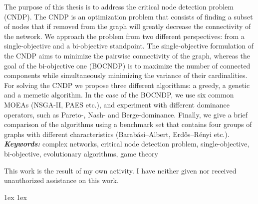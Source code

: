 \documentclass[final]{ubb_dolgozat}
\author{%
Béczi Eliézer
}
\providecommand{\keywords}[1]
{
  \small
  \textbf{\textit{Keywords:}} #1
}
\begin{document}
\maketitle

\begin{abstractEN} %
  {
    \vfill
    The purpose of this thesis is to address the critical node detection problem (CNDP).
    The CNDP is an optimization problem that consists of finding a subset of nodes that if removed from the graph will greatly decrease the connectivity of the network.
    We approach the problem from two different perspectives: from a single-objective and a bi-objective standpoint.
    The single-objective formulation of the CNDP aims to minimize the pairwise connectivity of the graph, whereas the goal of the bi-objective one (BOCNDP) is to maximize the number of connected components while simultaneously minimizing the variance of their cardinalities.
    For solving the CNDP we propose three different algorithms: a greedy, a genetic and a memetic algorithm.
    In the case of the BOCNDP, we use six common MOEAs (NSGA-II, PAES etc.), and experiment with different dominance operators, such as Pareto-, Nash- and Berge-dominance.
    Finally, we give a brief comparison of the algorithms using a benchmark set that contains four groups of graphs with different characteristics (Barabási–Albert, Erdős–Rényi etc.).
    \\[.5cm]
    \keywords{
      complex networks,
      critical node detection problem,
      single-objective,
      bi-objective,
      evolutionary algorithms,
      game theory
    }
    \vfill
  }
  \vspace*{.5cm}
  This work is the result of my own activity. I have neither given nor received unauthorized assistance on this work.
\end{abstractEN}

{
\baselineskip 1ex
\parskip 1ex
\tableofcontents
}












{ \renewcommand{\baselinestretch}{0.8}
  \normalsize
  \setlength{\itemsep}{-2.4mm}
  \setlength{\bibspacing}{0.67\baselineskip}
  
  
}
\end{document}
